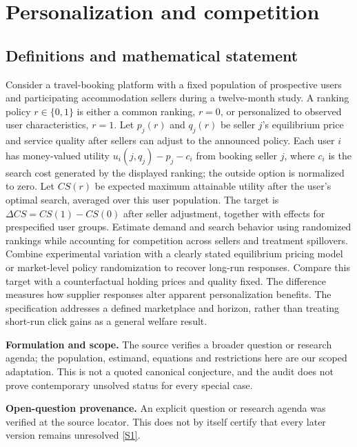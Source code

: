 \documentclass[11pt]{article}
\newcommand{\sref}[2]{\hyperlink{source:#1:#2}{[S#2]}}
\begin{document}
\section*{Personalization and competition}\label{30007682}
\subsection{Definitions and mathematical statement}
Consider a travel-booking platform with a fixed population of prospective users and participating accommodation sellers during a twelve-month study. A ranking policy \(r\in\{0,1\}\) is either a common ranking, \(r=0\), or personalized to observed user characteristics, \(r=1\). Let \(p_j(r)\) and \(q_j(r)\) be seller \(j\)'s equilibrium price and service quality after sellers can adjust to the announced policy. Each user \(i\) has money-valued utility \(u_i(j,q_j)-p_j-c_i\) from booking seller \(j\), where \(c_i\) is the search cost generated by the displayed ranking; the outside option is normalized to zero. Let \(CS(r)\) be expected maximum attainable utility after the user's optimal search, averaged over this user population. The target is \(\Delta CS=CS(1)-CS(0)\) after seller adjustment, together with effects for prespecified user groups. Estimate demand and search behavior using randomized rankings while accounting for competition across sellers and treatment spillovers. Combine experimental variation with a clearly stated equilibrium pricing model or market-level policy randomization to recover long-run responses. Compare this target with a counterfactual holding prices and quality fixed. The difference measures how supplier responses alter apparent personalization benefits. The specification addresses a defined marketplace and horizon, rather than treating short-run click gains as a general welfare result.

\par\textbf{Formulation and scope.} The source verifies a broader question or research agenda; the population, estimand, equations and restrictions here are our scoped adaptation. This is not a quoted canonical conjecture, and the audit does not prove contemporary unsolved status for every special case.

\par\textbf{Open-question provenance.} An explicit question or research agenda was verified at the source locator. This does not by itself certify that every later version remains unresolved \sref{30007682}{1}.
\end{document}
